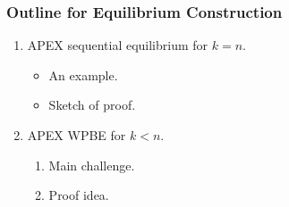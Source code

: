 \documentclass[10pt]{beamer}
\begin{document}

\begin{frame}


  \frametitle{Outline for Equilibrium Construction}

\begin{enumerate}

\item APEX sequential equilibrium for $k=n$.
\begin{itemize}
\item An example.
\item Sketch of proof.
\end{itemize}
\item APEX WPBE for $k<n$.
\begin{enumerate}
\item Main challenge.
\item Proof idea.
\end{enumerate}
\end{enumerate}


\end{frame}
\end{document}

